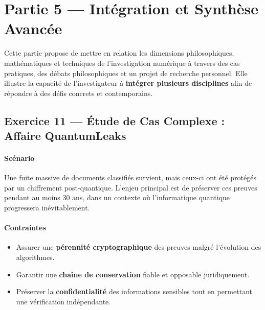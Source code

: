 \documentclass[11pt]{article}
\begin{document}
\section{Partie 5 — Intégration et Synthèse Avancée}

Cette partie propose de mettre en relation les dimensions philosophiques, 
mathématiques et techniques de l’investigation numérique à travers des cas pratiques, 
des débats philosophiques et un projet de recherche personnel.  
Elle illustre la capacité de l’investigateur à \textbf{intégrer plusieurs disciplines} 
afin de répondre à des défis concrets et contemporains.

\subsection{Exercice 11 — Étude de Cas Complexe : Affaire \og QuantumLeaks \fg}

\paragraph{Scénario}
Une fuite massive de documents classifiés survient, mais ceux-ci ont été 
protégés par un chiffrement post-quantique.  
L’enjeu principal est de préserver ces preuves pendant au moins 30 ans, 
dans un contexte où l’informatique quantique progressera inévitablement.  

\paragraph{Contraintes}
\begin{itemize}
  \item Assurer une \textbf{pérennité cryptographique} des preuves malgré l’évolution des algorithmes.
  \item Garantir une \textbf{chaîne de conservation} fiable et opposable juridiquement.
  \item Préserver la \textbf{confidentialité} des informations sensibles tout en permettant une vérification indépendante.
\end{itemize}
\end{document}

